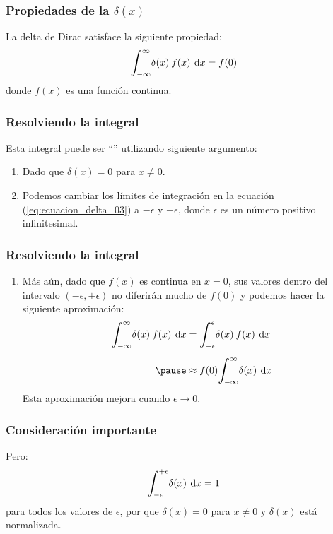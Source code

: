 \documentclass[12pt]{beamer}
\begin{document}
\begin{frame}
\frametitle{Propiedades de la $\delta (x)$}
La delta de Dirac satisface la siguiente propiedad:
\pause
\begin{equation}
\scaleint{6ex}_{\bs -\infty}^{\infty} \delta (x) \: f (x) \: \dd{x} = f (0)
\label{eq:ecuacion_delta_03}
\end{equation}
donde $f (x)$ es una función continua.
\end{frame}
\begin{frame}
\frametitle{Resolviendo la integral}
Esta integral puede ser \enquote{} utilizando siguiente argumento: \pause
{}
\begin{enumerate}[<+->]
\item Dado que $\delta (x) = 0$ para $x \neq 0$.
\item Podemos cambiar los límites de integración en la ecuación (\ref{eq:ecuacion_delta_03}) a $- \epsilon$ y $+ \epsilon$, donde $\epsilon$ es un número positivo infinitesimal.
\seti
\end{enumerate}
\end{frame}
\begin{frame}
\frametitle{Resolviendo la integral}
\begin{enumerate}[<+->]
\conti
\item Más aún, dado que $f (x)$ es continua en $x = 0$, sus valores dentro del intervalo $( - \epsilon, + \epsilon)$ no diferirán mucho de $f (0)$ y podemos hacer la siguiente aproximación:
\begin{eqnarray*}
\begin{aligned}
\scaleint{6ex}_{\bs -\infty}^{\infty} \delta (x) \: f (x) \: \dd{x} &= \scaleint{6ex}_{\bs -\epsilon}^{\epsilon} \delta (x) \: f (x) \: \dd{x} \\[0.5em] \pause
&\approx f (0) \scaleint{6ex}_{\bs -\infty}^{\infty} \delta (x) \: \dd{x}
\end{aligned}
\end{eqnarray*}
Esta aproximación mejora cuando $\epsilon \to 0$.
\end{enumerate}
\end{frame}
\begin{frame}
\frametitle{Consideración importante}
Pero:
\pause
\begin{align*}
\scaleint{6ex}_{\bs -\epsilon}^{+\epsilon} \delta (x) \: \dd{x} = 1
\end{align*}
para todos los valores de $\epsilon$, por que $\delta (x) = 0$ para $x \neq 0$ y $\delta (x)$ está normalizada.
\end{frame}
\end{document}
